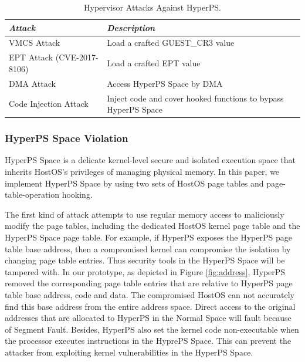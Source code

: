 \begin{table}
\centering
\caption{Hypervisor Attacks Against HyperPS.}\label{tab3}
\begin{tabular}{p{2.8cm}|p{5.5cm}}
\hline
{\itshape\bfseries Attack} & {\itshape\bfseries Description} \\
\hline
VMCS Attack & Load a crafted GUEST\_CR3 value\\
\hline
EPT Attack (CVE-2017-8106) & Load a crafted EPT value \\
\hline
DMA Attack & Access HyperPS Space by DMA \\
\hline
Code Injection Attack & Inject code and cover hooked functions to bypass HyperPS Space \\
\hline
\end{tabular}
\end{table}




\subsubsection{HyperPS Space Violation}%
\label{ssub:hyperps_space_violation}
HyperPS Space is a delicate kernel-level secure and isolated execution space that inherits HostOS's privileges of managing physical memory. 
In this paper, we implement HyperPS Space by using two sets of HostOS page tables and page-table-operation hooking.

The first kind of attack attempts to use regular memory access to maliciously modify the page tables, including the dedicated HostOS kernel page table and the HyperPS Space page table.
For example, if HyperPS exposes the HyperPS page table base address, then a compromised kernel can compromise the isolation by changing page table entries. Thus security tools in the HyperPS Space will be tampered with. 
In our prototype, as depicted in Figure \ref{fig:address},
HyperPS removed the corresponding page table entries that are relative to HyperPS page table base address, code and data. 
The compromised HostOS can not accurately find this base address from the entire address space. 
Direct access to the original addresses that are allocated to HyperPS in the Normal Space will fault because of Segment Fault.
Besides, HyperPS also set the kernel code non-executable when the processor executes instructions in the HyprePS Space. This can prevent the attacker from exploiting kernel vulnerabilities in the HyperPS Space.


